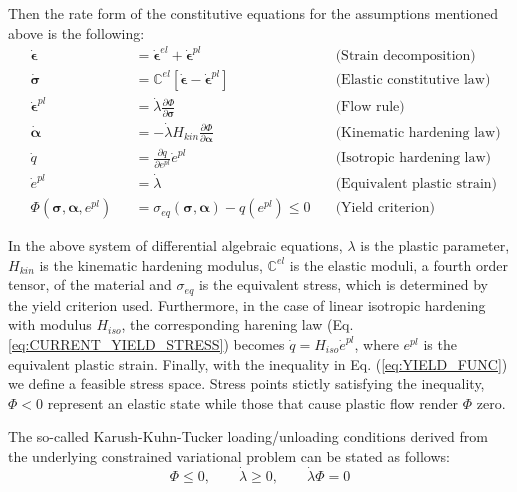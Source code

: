 Then the rate form of the constitutive equations for the assumptions mentioned 
above is the following:
\begin{subequations}
	\begin{alignat}{3}
		&\dot{\bm{\epsilon}} &&= \dot{\bm{\epsilon}}^{el} +
		\dot{\bm{\epsilon}}^{pl}\quad& \text{(Strain 
		decomposition)}\label{eq:RATE_DECOMP}\\
		&\dot{\bm{\sigma}} &&= \mathbb{C}^{el}\left[\dot{\bm{\epsilon}} -
		\dot{\bm{\epsilon}}^{pl} \right]\quad& \text{(Elastic constitutive 
		law)}\label{eq:CONSTITUTIVE_LAW}\\
		&\dot{\bm{\epsilon}}^{pl} &&= \dot{\lambda}\frac{\partial \Phi}{\partial
			\bm{\sigma}}\quad& \text{(Flow rule)}\label{eq:FLOW_RULE}\\
		&\dot{\bm{\alpha}} &&= -\dot{\lambda}H_{kin}\frac{\partial 
		\Phi}{\partial
			\bm{\alpha}}\quad& \text{(Kinematic
			hardening law)}\label{eq:BACK_STRESS}\\
		&\dot{q} &&= \frac{\partial q}{\partial
			e^{pl}}\dot{e}^{pl}\quad& \text{(Isotropic hardening law)}
		\label{eq:CURRENT_YIELD_STRESS}\\
		&\dot{e}^{pl} &&= \dot{\lambda}\quad& \text{(Equivalent plastic 
		strain)}\label{eq:EQUIV_PLASTIC_STRAIN}\\
		&\Phi(\bm{\sigma},\bm{\alpha},e^{pl}) &&= 
		\sigma_{eq}(\bm{\sigma},\bm{\alpha}) - q(e^{pl}) \leq 0\quad&
		\text{(Yield criterion)}\label{eq:YIELD_FUNC} 
	\end{alignat}
	\label{eq:THREE_D_RATE}
\end{subequations}

In the above system of differential algebraic equations, $\lambda$ is the 
plastic
parameter, $H_{kin}$ is the kinematic hardening modulus, $\mathbb{C}^{el}$ is 
the elastic moduli, a fourth order tensor, of the material and $\sigma_{eq}$ is 
the equivalent stress, which is determined by the
yield criterion used. Furthermore, in the case of linear
isotropic hardening with modulus $H_{iso}$, the corresponding harening law (Eq. 
\ref{eq:CURRENT_YIELD_STRESS}) becomes $\dot{q} =
H_{iso}\dot{e}^{pl}$, where $e^{pl}$ is the equivalent plastic strain. Finally, 
with the inequality in Eq. (\ref{eq:YIELD_FUNC})
we define a feasible stress space. Stress points stictly satisfying the
inequality, $\Phi<0$ represent an elastic state while those that cause plastic 
flow
render $\Phi$ zero.

The so-called Karush-Kuhn-Tucker loading/unloading conditions derived from the 
underlying constrained variational problem\cite{Simo2006} can be stated as
follows:
\begin{equation}
	\Phi\leq 0,\qquad \dot{\lambda} \geq 0,\qquad \dot{\lambda}\Phi=0
	\label{eq:KKT_CONDITIONS}
\end{equation}

